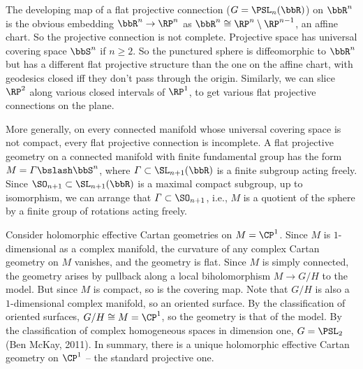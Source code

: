 \begin{example}\label{ex flat projective structures}
    The developing map of a flat projective connection ($G=\PSL_n(\bbR)$) on $\bbR^n$ is the obvious embedding $\bbR^n\to \RP^n$ as $\bbR^n\cong \RP^n\setminus \RP^{n-1}$, an affine chart. So the projective connection is not complete. Projective space has universal covering space $\bbS^n$ if $n\geq 2$. So the punctured sphere is diffeomorphic to $\bbR^n$ but has a different flat projective structure than the one on the affine chart, with geodesics closed iff they don't pass through the origin. Similarly, we can slice $\RP^2$ along various closed intervals of $\RP^1$, to get various flat projective connections on the plane.

    More generally, on every connected manifold whose universal covering space is not compact, every flat projective connection is incomplete. A flat projective geometry on a connected manifold with finite fundamental group has the form $M=\varGamma\bslash \bbS^n$, where $\varGamma\subset \SL_{n+1}(\bbR)$ is a finite subgroup acting freely. Since $\SO_{n+1}\subset\SL_{n+1}(\bbR)$ is a maximal compact subgroup, up to isomorphism, we can arrange that $\varGamma\subset\SO_{n+1}$, i.e., $M$ is a quotient of the sphere by a finite group of rotations acting freely.
\end{example}

\begin{example}
    Consider holomorphic effective Cartan geometries on $M=\CP^1$. Since $M$ is $1$-dimensional as a complex manifold, the curvature of any complex Cartan geometry on $M$ vanishes, and the geometry is flat. Since $M$ is simply connected, the geometry arises by pullback along a local biholomorphism $M\to G\slash H$ to the model. But since $M$ is compact, so is the covering map. Note that $G\slash H$ is also a $1$-dimensional complex manifold, so an oriented surface. By the classification of oriented surfaces, $G\slash H\cong M=\CP^1$, so the geometry is that of the model. By the classification of complex homogeneous spaces in dimension one, $G=\PSL_2$ (Ben McKay, 2011). In summary, there is a unique holomorphic effective Cartan geometry on $\CP^1$ -- the standard projective one.
\end{example}

